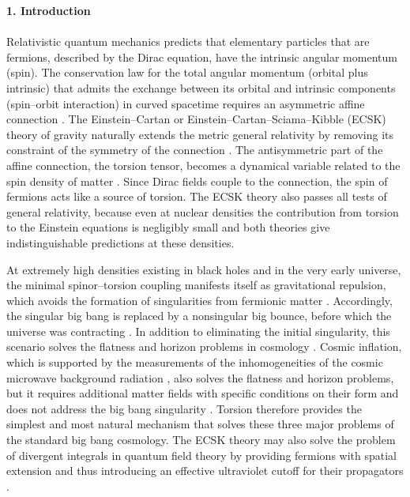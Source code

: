 \documentclass[prd,onecolumn,nofootinbib]{revtex4}
\begin{document}
{\bf 1. Introduction}\\ \\
Relativistic quantum mechanics predicts that elementary particles that are fermions, described by the Dirac equation, have the intrinsic angular momentum (spin).
The conservation law for the total angular momentum (orbital plus intrinsic) that admits the exchange between its orbital and intrinsic components (spin--orbit interaction) in curved spacetime requires an asymmetric affine connection \cite{req}.
The Einstein--Cartan or Einstein--Cartan--Sciama--Kibble (ECSK) theory of gravity naturally extends the metric general relativity by removing its constraint of the symmetry of the connection \cite{ScKi}.
The antisymmetric part of the affine connection, the torsion tensor, becomes a dynamical variable related to the spin density of matter \cite{ScKi,Hehl,review,Lor,Niko}.
Since Dirac fields couple to the connection, the spin of fermions acts like a source of torsion.
The ECSK theory also passes all tests of general relativity, because even at nuclear densities the contribution from torsion to the Einstein equations is negligibly small and both theories give indistinguishable predictions at these densities.

At extremely high densities existing in black holes and in the very early universe, the minimal spinor--torsion coupling manifests itself as gravitational repulsion, which avoids the formation of singularities from fermionic matter \cite{avert,HHK,Dir,Gas,Bre,torsion1,torsion2,torsion3,Mag}.
Accordingly, the singular big bang is replaced by a nonsingular big bounce, before which the universe was contracting \cite{Kuc,Gar,torsion1}.
In addition to eliminating the initial singularity, this scenario solves the flatness and horizon problems in cosmology \cite{torsion1,torsion2,torsion3,Mag}.
Cosmic inflation, which is supported by the measurements of the inhomogeneities of the cosmic microwave background radiation \cite{Ric}, also solves the flatness and horizon problems, but it requires additional matter fields with specific conditions on their form and does not address the big bang singularity \cite{infl}.
Torsion therefore provides the simplest and most natural mechanism that solves these three major problems of the standard big bang cosmology.
The ECSK theory may also solve the problem of divergent integrals in quantum field theory by providing fermions with spatial extension and thus introducing an effective ultraviolet cutoff for their propagators \cite{Dir}.
\end{document}
